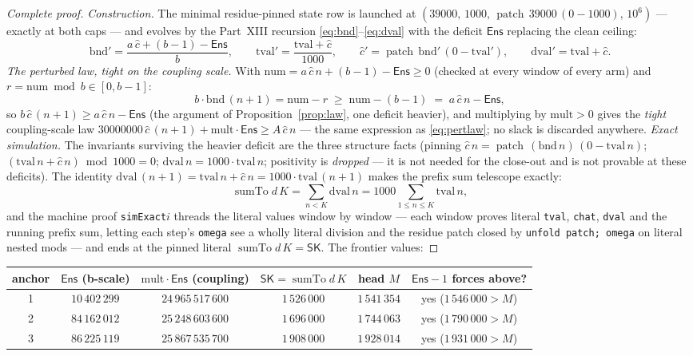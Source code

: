 \documentclass[11pt]{article}
\newcommand{\chat}{\widehat{c}}
\newcommand{\sumto}{\operatorname{sumTo}}
\newcommand{\patch}{\operatorname{patch}}
\theoremstyle{plain}
\theoremstyle{definition}
\begin{document}
\begin{proof}[Complete proof]
\emph{Construction.} The minimal residue-pinned state row is launched at
$(39000,\,1000,\,\patch\,39000\,(0-1000),\,10^{6})$ --- exactly at both caps --- and
evolves by the Part~XIII recursion \eqref{eq:bnd}--\eqref{eq:dval} with the deficit
$\mathsf{Ens}$ replacing the clean ceiling:
\[
\mathrm{bnd}'=\frac{a\,\chat+(b-1)-\mathsf{Ens}}{b},
\qquad
\mathrm{tval}'=\frac{\mathrm{tval}+\chat}{1000},
\qquad
\chat'=\patch\,\mathrm{bnd}'\,(0-\mathrm{tval}'),
\qquad
\mathrm{dval}'=\mathrm{tval}+\chat .
\]
\emph{The perturbed law, tight on the coupling scale.} With
$\mathrm{num}=a\,\chat\,n+(b-1)-\mathsf{Ens}\ge 0$ (checked at every window of every arm)
and $r=\mathrm{num}\bmod b\in[0,b-1]$:
\[
b\cdot\mathrm{bnd}\,(n+1)=\mathrm{num}-r\;\ge\;\mathrm{num}-(b-1)\;=\;a\,\chat\,n-\mathsf{Ens},
\]
so $b\,\chat\,(n+1)\ge a\,\chat\,n-\mathsf{Ens}$ (the argument of
Proposition~\ref{prop:law}, one deficit heavier), and multiplying by
$\mathrm{mult}>0$ gives the \emph{tight} coupling-scale law
$30000000\,\chat\,(n+1)+\mathrm{mult}\cdot\mathsf{Ens}\ge A\,\chat\,n$ --- the same
expression as \eqref{eq:pertlaw}; no slack is discarded anywhere.
\emph{Exact simulation.} The invariants surviving the heavier deficit are the three
structure facts (pinning $\chat\,n=\patch\,(\mathrm{bnd}\,n)\,(0-\mathrm{tval}\,n)$;
$(\mathrm{tval}\,n+\chat\,n)\bmod 1000=0$; $\mathrm{dval}\,n=1000\cdot\mathrm{tval}\,n$;
positivity is \emph{dropped} --- it is not needed for the close-out and is not provable at
these deficits). The identity $\mathrm{dval}\,(n+1)=\mathrm{tval}\,n+\chat\,n
=1000\cdot\mathrm{tval}\,(n+1)$ makes the prefix sum telescope exactly:
\[
\sumto d\,K=\sum_{n<K}\mathrm{dval}\,n=1000\sum_{1\le n\le K}\mathrm{tval}\,n ,
\]
and the machine proof \texttt{simExact$i$} threads the literal values window by window ---
each window proves literal \texttt{tval}, \texttt{chat}, \texttt{dval} and the running
prefix sum, letting each step's \texttt{omega} see a wholly literal division and the
residue patch closed by \texttt{unfold patch; omega} on literal nested mods --- and ends
at the pinned literal $\sumto d\,K=\mathsf{SK}$. The frontier values:
\end{proof}

\begin{center}
\begin{tabular}{c c c c c c}
\hline
\textbf{anchor} & $\mathsf{Ens}$ (b-scale) & $\mathrm{mult}\cdot\mathsf{Ens}$ (coupling) & $\mathsf{SK}=\sumto d\,K$ & head $M$ & $\mathsf{Ens}-1$ forces above?\\
\hline
1 & $10\,402\,299$ & $24\,965\,517\,600$ & $1\,526\,000$ & $1\,541\,354$ & yes ($1\,546\,000>M$)\\
2 & $84\,162\,012$ & $25\,248\,603\,600$ & $1\,696\,000$ & $1\,744\,063$ & yes ($1\,790\,000>M$)\\
3 & $86\,225\,119$ & $25\,867\,535\,700$ & $1\,908\,000$ & $1\,928\,014$ & yes ($1\,931\,000>M$)\\
\hline
\end{tabular}
\end{center}
\end{document}
